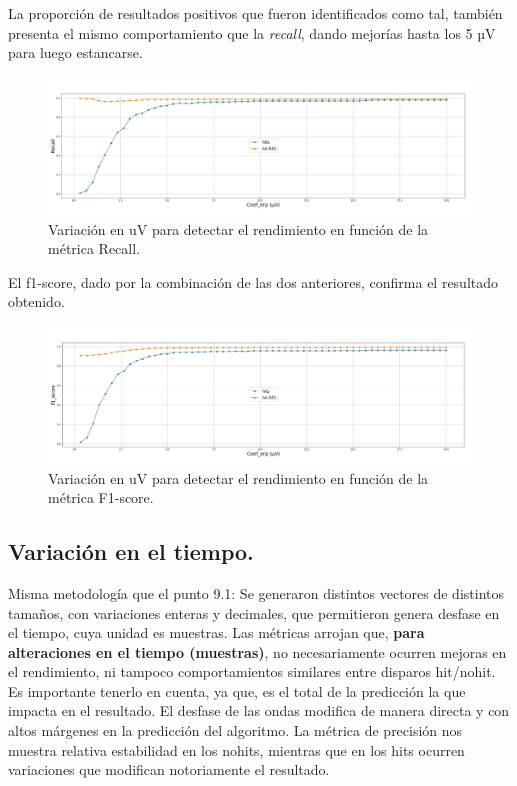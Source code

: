 \documentclass[../00_Main.tex]{subfiles}
\begin{document}
La proporción de resultados positivos que fueron identificados como tal, también presenta el mismo comportamiento  que la \textit{recall}, dando mejorías hasta los 5 µV para luego estancarse.

\begin{figure}[H]
    \raggedright
    \includegraphics[scale=0.26]{02_Images/resultados_caso1_b_recall}
    \caption{Variación en uV para detectar el rendimiento en función de la métrica Recall.}
    \label{fig:resultados_caso1_b_recall}
\end{figure}  

El f1-score, dado por la combinación de las dos anteriores, confirma el resultado obtenido.

\begin{figure}[H]
    \raggedright
    \includegraphics[scale=0.26]{02_Images/resultados_caso1_c_f1_score}
    \caption{Variación en uV para detectar el rendimiento en función de la métrica F1-score.}
    \label{fig:resultados_caso1_c_f1_score}
\end{figure}

\subsection{Variación en el tiempo.}
Misma metodología que el punto 9.1: Se generaron distintos vectores de distintos tamaños, con variaciones enteras y decimales, que permitieron genera desfase en el tiempo, cuya unidad es muestras. Las métricas arrojan que, \textbf{para alteraciones en el tiempo (muestras)}, no necesariamente ocurren mejoras en el rendimiento, ni tampoco comportamientos similares entre disparos hit/nohit. Es importante tenerlo en cuenta, ya que, es el total de la predicción la que impacta en el resultado. El desfase de las ondas modifica de manera directa y con altos márgenes en la predicción del algoritmo.
La métrica de precisión nos muestra relativa estabilidad en los nohits, mientras que en los hits ocurren variaciones que modifican notoriamente el resultado. 
\end{document}
